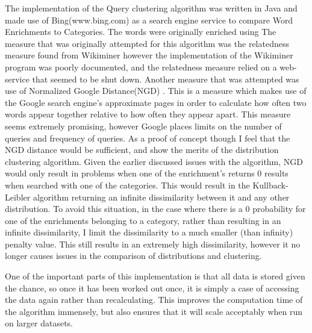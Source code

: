 \documentclass[letterpaper]{article}
\begin{document}
The implementation of the Query clustering algorithm was written in Java and made use of Bing(www.bing.com) as a search engine service to compare Word Enrichments to Categories. The words were originally enriched using 
The measure that was originally attempted for this algorithm was the relatedness measure found from Wikiminer \cite{witten2008effective} however the implementation of the Wikiminer program was poorly documented, and the relatedness measure relied on a web-service that seemed to be shut down. Another measure that was attempted was use of Normalized Google Distance(NGD) \cite{cilibrasi2007google}. This is a measure which makes use of the 
Google search engine's approximate pages in order to calculate how often two words appear together relative to how often they appear apart. This measure seems extremely promising, however
Google places limits on the number of queries and frequency of queries. As a proof of concept though I feel that the NGD distance would be sufficient, and show the merits of the distribution clustering algorithm. Given the earlier discussed issues with the algorithm, NGD would only result in problems when one of the enrichment's returns 0 results when searched with one of the categories. 
This would result in the Kullback-Leibler algorithm returning an infinite dissimilarity between it and any other distribution. To avoid this situation, in the case where there is a 0 probability for one of the enrichments belonging to a category, rather than resulting in an infinite dissimilarity, I limit the dissimilarity to a much smaller (than infinity) penalty value. This still results in an extremely high dissimilarity, however it no longer causes issues in the comparison of distributions and clustering.

One of the important parts of this implementation is that all data is stored given the chance, so once it has been worked out once, it is simply a case of accessing the data again rather than recalculating.
This improves the computation time of the algorithm immensely, but also ensures that it will scale acceptably when run on larger datasets.
\end{document}
